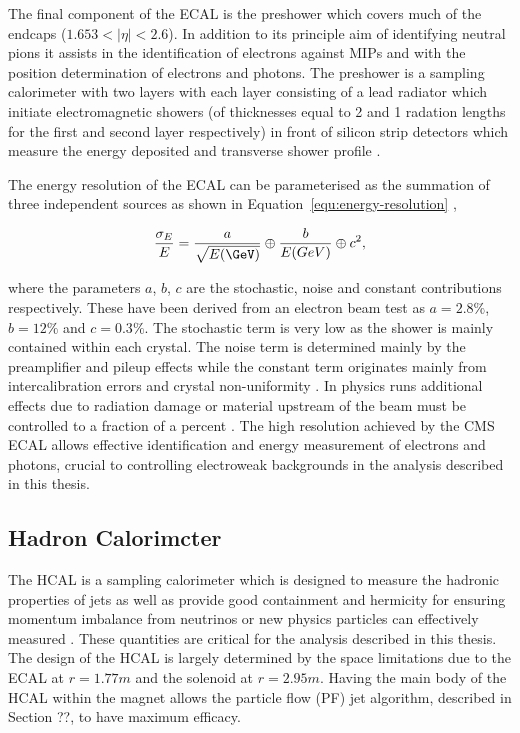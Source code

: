The final component of the ECAL is the preshower which covers much of the endcaps ($1.653 < |\eta| < 2.6$). In addition
to its principle aim of identifying neutral pions it assists in the identification of electrons against MIPs and with
the position determination of electrons and photons. The preshower is a sampling calorimeter with two layers with each layer
consisting of a lead radiator which initiate electromagnetic showers (of thicknesses equal to 2 and 1 radation lengths for the 
first and second layer respectively) in front of silicon strip detectors which 
measure the energy deposited and transverse shower profile \cite{ecal_tdr}.  

The energy resolution of the ECAL can be parameterised as the summation of three independent sources as shown 
in Equation~\ref{equ:energy-resolution} \cite{ecal_performance2},

\begin{equation}
\frac{\sigma_E}{E} = \frac{a}{\sqrt{E(\GeV)}} \oplus \frac{b}{E(GeV)} \oplus c^2,
\label{equ:energy-resolution}
\end{equation}

where the parameters $a$, $b$, $c$ are the stochastic, noise and constant contributions respectively. These have been
derived from an electron beam test as $a=2.8\%$, $b=12\%$ and $c=0.3\%$. The stochastic
term is very low as the shower is mainly contained within each crystal. The noise term is determined mainly by 
the preamplifier and pileup effects while the constant term originates mainly from intercalibration errors and crystal non-uniformity \cite{ecal_tdr}. 
In physics runs additional effects due to radiation damage or material upstream of the beam must be controlled to a 
fraction of a percent \cite{ecal_performance}. The high resolution achieved by the CMS ECAL allows effective identification and energy measurement of electrons and photons, crucial to
controlling electroweak backgrounds in the analysis described in this thesis.

\subsection{Hadron Calorimcter}

The HCAL is a sampling calorimeter which is designed to measure the hadronic properties of jets as well as provide good 
containment and hermicity for ensuring momentum imbalance from neutrinos or new physics particles can effectively measured \cite{hcal_tdr}.
These quantities are critical for the analysis described in this thesis.
The design of the HCAL is largely determined by the space limitations due to the ECAL at $r = 1.77 m$ and the solenoid at $r = 2.95 m$.
Having the main body of the HCAL within the magnet allows the particle flow (PF) jet algorithm, described in Section ??, to have maximum 
efficacy. 

